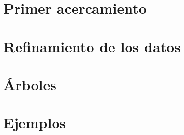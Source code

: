 \lipsum[1-1]

\section{Primer acercamiento}
\lipsum[2-4]

\section{Refinamiento de los datos}
\lipsum[2-4]

\section{Árboles}
\lipsum[2-4]

\section{Ejemplos}
\lipsum[2-4]
